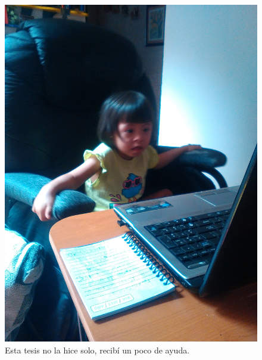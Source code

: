 \documentclass[11pt, twoside]{book}
\newcommand\Ion[2]{\ensuremath{\mathrm{#1\,\scriptstyle #2}}} %
\begin{document}



\begin{figure}
  \centering
  \includegraphics[width=0.4\linewidth]{./Figures/helping}
  \caption*{Esta tesis no la hice solo, recibí un poco de ayuda.}
\end{figure}
\end{document}
